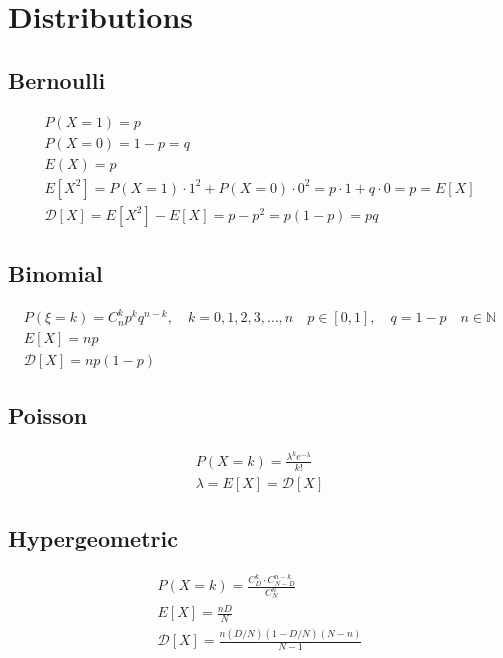 \section*{Distributions}

\subsection{Bernoulli}

\begin{gather*}
P(X = 1) = p \\
P(X = 0) = 1 - p = q \\
E(X) = p \\
E \left[ X^2 \right] = P(X=1) \cdot 1^2 + P(X=0) \cdot 0^2 = p \cdot 1 + q \cdot 0 = p = E [X] \\
\mathcal{D}[X] = E[X^2] - E[X] = p - p ^2 = p(1-p) = pq
\end{gather*}

\subsection{Binomial}

\begin{gather*}
    P(\xi = k) = C_n^k p^k q^{n-k}, \quad k = 0,1,2,3,\ldots,n \quad
    p \in [0, 1], \quad q = 1-p \quad n \in \mathbb{N} \\
    E[X] = np \\
    \mathcal{D}[X] = np(1-p)
\end{gather*}

\subsection{Poisson}

\begin{gather*}
    P(X=k) = \frac{\lambda^k e^{-\lambda}}{k!} \\
    \lambda = E[X] = \mathcal{D}[X]
\end{gather*}

\subsection{Hypergeometric}
\begin{gather*}
    P(X=k) = \frac{C_D^k \cdot C_{N-D}^{n-k}}{C_N^n} \\
    E[X] = \frac{nD}{N} \\
    \mathcal{D}[X] = \frac{n(D / N) (1 - D / N) (N - n)}{N - 1}
\end{gather*}

